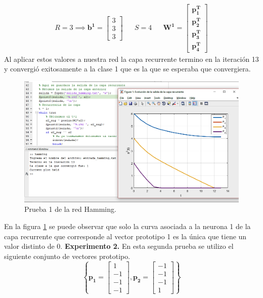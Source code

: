 \begin{align*}
R = 3 \implies \boldsymbol{b^1} = \left[\begin{array}{c}3\\ 3\\ 3\end{array}\right] && S = 4 && \boldsymbol{W^1} = \left[\begin{array}{c}\boldsymbol{p^{T}_1}\\ \boldsymbol{p^{T}_2}\\ \boldsymbol{p^{T}_3} \\ \boldsymbol{p^{T}_4}\end{array}\right]
\end{align*}
Al aplicar estos valores a nuestra red la capa recurrente termino en la iteración 13 y convergió exitosamente a la clase 1 que es la que se esperaba que convergiera.
\begin{figure}[H]
    \begin{center}
        \includegraphics[width=16cm]{img/hamming/hamming1.png}
        \caption{Prueba 1 de la red Hamming.}
        \label{fig:hamming1}
    \end{center}
\end{figure}
En la figura \ref{fig:hamming1} se puede observar que solo la curva asociada a la neurona 1 de la capa recurrente que corresponde al vector prototipo 1 es la única que tiene un valor distinto de 0.
\newline
\textbf{Experimento 2.}
En esta segunda prueba se utilizo el siguiente conjunto de vectores prototipo.
\[ \left\lbrace \boldsymbol{p_1} = \left[\begin{array}{c}1\\ -1\\ -1 \\ -1 \end{array}\right], \boldsymbol{p_2} = \left[\begin{array}{c}-1\\ -1\\ -1 \\ 1 \end{array}\right] \right\rbrace \]
